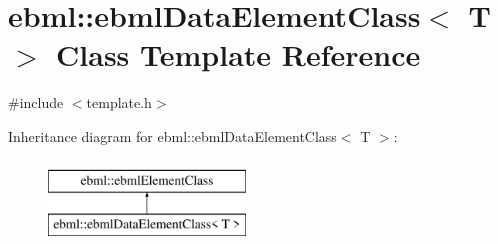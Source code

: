 \hypertarget{classebml_1_1ebmlDataElementClass}{}\section{ebml\+:\+:ebml\+Data\+Element\+Class$<$ T $>$ Class Template Reference}
\label{classebml_1_1ebmlDataElementClass}


{\ttfamily \#include $<$template.\+h$>$}

Inheritance diagram for ebml\+:\+:ebml\+Data\+Element\+Class$<$ T $>$\+:\begin{figure}[H]
\begin{center}
\leavevmode
\includegraphics[height=2.000000cm]{classebml_1_1ebmlDataElementClass}
\end{center}
\end{figure}
